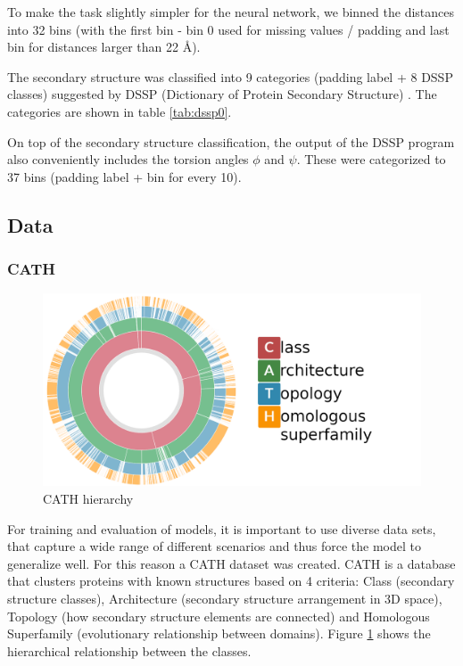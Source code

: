 To make the task slightly simpler for the neural network, we binned the distances into 32 bins (with the first bin - bin 0 used for missing values / padding and last bin for distances larger than 22 \AA).
        
The secondary structure was classified into 9 categories (padding label + 8 DSSP classes) suggested by DSSP (Dictionary of Protein Secondary Structure) \cite{dssp1, dssp2, dssp3}.
The categories are shown in table \ref{tab:dssp0}.

On top of the secondary structure classification, the output of the DSSP program also conveniently includes the torsion angles $\phi$ and $\psi$. These were categorized to 37 bins (padding label + bin for every 10\degree).

\subsection{Data}

\subsubsection{CATH}
\begin{figure}
    \centering
    \includegraphics[width=\linewidth]{imgs_tomas/cath.png}
    \caption{CATH hierarchy \cite{cath}}
    \label{fig:cath}
\end{figure}

For training and evaluation of models, it is important to use diverse data sets, that capture a wide range of different scenarios and thus force the model to generalize well. For this reason a CATH dataset was created.
CATH is a database that clusters proteins with known structures based on 4 criteria: Class (secondary structure classes), Architecture (secondary structure arrangement in 3D space), Topology (how secondary structure elements are connected) and Homologous Superfamily (evolutionary relationship between domains). 
Figure \ref{fig:cath} shows the hierarchical relationship between the classes.
    
